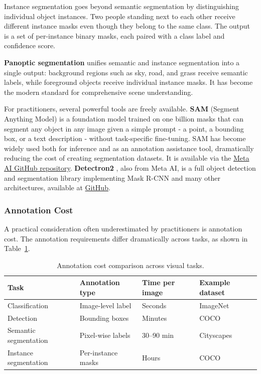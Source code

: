 Instance segmentation goes beyond semantic segmentation by distinguishing individual object instances. Two people standing next to each other receive different instance masks even though they belong to the same class. The output is a set of per-instance binary masks, each paired with a class label and confidence score.

\textbf{Panoptic segmentation} unifies semantic and instance segmentation into a single output: background regions such as sky, road, and grass receive semantic labels, while foreground objects receive individual instance masks. It has become the modern standard for comprehensive scene understanding.

For practitioners, several powerful tools are freely available. \textbf{SAM} (Segment Anything Model) \parencite{Kirillov2023} is a foundation model trained on one billion masks that can segment any object in any image given a simple prompt - a point, a bounding box, or a text description - without task-specific fine-tuning. SAM has become widely used both for inference and as an annotation assistance tool, dramatically reducing the cost of creating segmentation datasets. It is available via the \href{https://github.com/facebookresearch/sam2}{Meta AI GitHub repository}. \textbf{Detectron2} \parencite{Wu2019}, also from Meta AI, is a full object detection and segmentation library implementing Mask R-CNN and many other architectures, available at \href{https://github.com/facebookresearch/detectron2}{GitHub}.

\subsubsection{Annotation Cost}

A practical consideration often underestimated by practitioners is annotation cost. The annotation requirements differ dramatically across tasks, as shown in Table~\ref{tab:annotation}.

\begin{table}[h]
\centering
\begin{tabular}{llll}
\toprule
\textbf{Task} & \textbf{Annotation type} & \textbf{Time per image} & \textbf{Example dataset} \\
\midrule
Classification & Image-level label & Seconds & ImageNet \\
Detection & Bounding boxes & Minutes & COCO \\
Semantic segmentation & Pixel-wise labels & 30--90 min & Cityscapes \\
Instance segmentation & Per-instance masks & Hours & COCO \\
\bottomrule
\end{tabular}
\caption{Annotation cost comparison across visual tasks.}
\label{tab:annotation}
\end{table}

